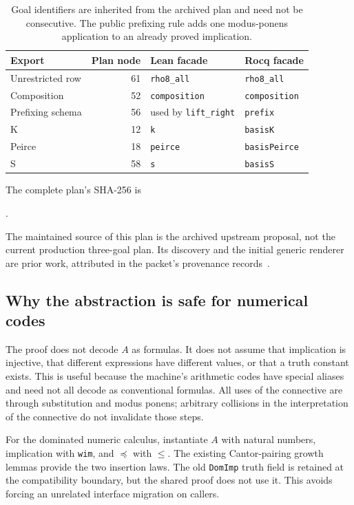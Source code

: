 \documentclass[11pt]{article}
\newcommand{\Below}{\mathrel{\preccurlyeq}}
\begin{document}
\begin{table}[ht]
\centering
\begin{tabular}{lrll}
\toprule
Export & Plan node & Lean facade & Rocq facade\\
\midrule
Unrestricted row & 61 & \texttt{rho8\_all} & \texttt{rho8\_all}\\
Composition & 52 & \texttt{composition} & \texttt{composition}\\
Prefixing schema & 56 & used by \texttt{lift\_right} & \texttt{prefix}\\
K & 12 & \texttt{k} & \texttt{basisK}\\
Peirce & 18 & \texttt{peirce} & \texttt{basisPeirce}\\
S & 58 & \texttt{s} & \texttt{basisS}\\
\bottomrule
\end{tabular}
\caption{Goal identifiers are inherited from the archived plan and need not be consecutive. The public prefixing rule adds one modus-ponens application to an already proved implication.}
\label{tab:goals}
\end{table}

The complete plan's SHA-256 is
\begin{center}\small
{}.
\end{center}
The maintained source of this plan is the archived upstream proposal, not the current production three-goal plan. Its discovery and the initial generic renderer are prior work, attributed in the packet's provenance records~\cite{sharedprior,archivedcore}.

\subsection{Why the abstraction is safe for numerical codes}

The proof does not decode $A$ as formulas. It does not assume that implication is injective, that different expressions have different values, or that a truth constant exists. This is useful because the machine's arithmetic codes have special aliases and need not all decode as conventional formulas. All uses of the connective are through substitution and modus ponens; arbitrary collisions in the interpretation of the connective do not invalidate those steps.

For the dominated numeric calculus, instantiate $A$ with natural numbers, implication with \texttt{wim}, and $\Below$ with $\leq$. The existing Cantor-pairing growth lemmas provide the two insertion laws. The old \texttt{DomImp} truth field is retained at the compatibility boundary, but the shared proof does not use it. This avoids forcing an unrelated interface migration on callers.
\end{document}
